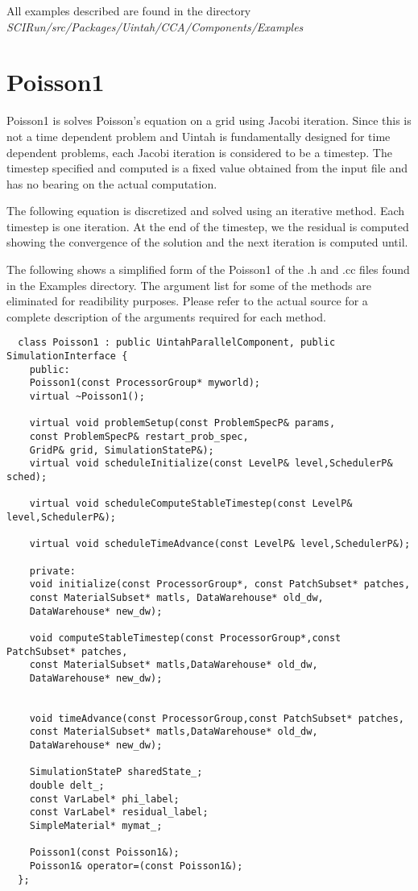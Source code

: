 \documentclass[11pt,fleqn]{book} %
\begin{document}
All examples described are found in the directory
\emph{SCIRun/src/Packages/Uintah/CCA/Components/Examples}

\section{Poisson1}

Poisson1 is solves Poisson's equation on a grid using Jacobi
iteration.  Since this is not a time dependent problem and Uintah is
fundamentally designed for time dependent problems, each Jacobi
iteration is considered to be a timestep.  The timestep specified and
computed is a fixed value obtained from the input file and has no
bearing on the actual computation.

The following equation is discretized and solved using an iterative
method. Each timestep is one iteration. At the end of the timestep, we
the residual is computed showing the convergence of the solution and
the next iteration is computed until.

The following shows a simplified form of the Poisson1 of the .h and
.cc files found in the Examples directory.  The argument list for some
of the methods are eliminated for readibility purposes.  Please refer
to the actual source for a complete description of the arguments
required for each method.

\begin{lstlisting}
  class Poisson1 : public UintahParallelComponent, public SimulationInterface {
    public:
    Poisson1(const ProcessorGroup* myworld);
    virtual ~Poisson1();

    virtual void problemSetup(const ProblemSpecP& params,
    const ProblemSpecP& restart_prob_spec,
    GridP& grid, SimulationStateP&);
    virtual void scheduleInitialize(const LevelP& level,SchedulerP& sched);

    virtual void scheduleComputeStableTimestep(const LevelP& level,SchedulerP&);

    virtual void scheduleTimeAdvance(const LevelP& level,SchedulerP&);

    private:
    void initialize(const ProcessorGroup*, const PatchSubset* patches,
    const MaterialSubset* matls, DataWarehouse* old_dw,
    DataWarehouse* new_dw);

    void computeStableTimestep(const ProcessorGroup*,const PatchSubset* patches,
    const MaterialSubset* matls,DataWarehouse* old_dw,
    DataWarehouse* new_dw);


    void timeAdvance(const ProcessorGroup,const PatchSubset* patches,
    const MaterialSubset* matls,DataWarehouse* old_dw,
    DataWarehouse* new_dw);

    SimulationStateP sharedState_;
    double delt_;
    const VarLabel* phi_label;
    const VarLabel* residual_label;
    SimpleMaterial* mymat_;

    Poisson1(const Poisson1&);
    Poisson1& operator=(const Poisson1&);
  };
\end{lstlisting}
\end{document}
